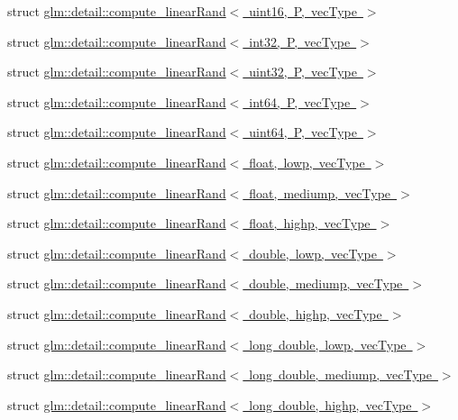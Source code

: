 \begin{DoxyCompactItemize}
\item 
struct \mbox{\hyperlink{structglm_1_1detail_1_1compute__linear_rand_3_01uint16_00_01_p_00_01vec_type_01_4}{glm\+::detail\+::compute\+\_\+linear\+Rand$<$ uint16, P, vec\+Type $>$}}
\item 
struct \mbox{\hyperlink{structglm_1_1detail_1_1compute__linear_rand_3_01int32_00_01_p_00_01vec_type_01_4}{glm\+::detail\+::compute\+\_\+linear\+Rand$<$ int32, P, vec\+Type $>$}}
\item 
struct \mbox{\hyperlink{structglm_1_1detail_1_1compute__linear_rand_3_01uint32_00_01_p_00_01vec_type_01_4}{glm\+::detail\+::compute\+\_\+linear\+Rand$<$ uint32, P, vec\+Type $>$}}
\item 
struct \mbox{\hyperlink{structglm_1_1detail_1_1compute__linear_rand_3_01int64_00_01_p_00_01vec_type_01_4}{glm\+::detail\+::compute\+\_\+linear\+Rand$<$ int64, P, vec\+Type $>$}}
\item 
struct \mbox{\hyperlink{structglm_1_1detail_1_1compute__linear_rand_3_01uint64_00_01_p_00_01vec_type_01_4}{glm\+::detail\+::compute\+\_\+linear\+Rand$<$ uint64, P, vec\+Type $>$}}
\item 
struct \mbox{\hyperlink{structglm_1_1detail_1_1compute__linear_rand_3_01float_00_01lowp_00_01vec_type_01_4}{glm\+::detail\+::compute\+\_\+linear\+Rand$<$ float, lowp, vec\+Type $>$}}
\item 
struct \mbox{\hyperlink{structglm_1_1detail_1_1compute__linear_rand_3_01float_00_01mediump_00_01vec_type_01_4}{glm\+::detail\+::compute\+\_\+linear\+Rand$<$ float, mediump, vec\+Type $>$}}
\item 
struct \mbox{\hyperlink{structglm_1_1detail_1_1compute__linear_rand_3_01float_00_01highp_00_01vec_type_01_4}{glm\+::detail\+::compute\+\_\+linear\+Rand$<$ float, highp, vec\+Type $>$}}
\item 
struct \mbox{\hyperlink{structglm_1_1detail_1_1compute__linear_rand_3_01double_00_01lowp_00_01vec_type_01_4}{glm\+::detail\+::compute\+\_\+linear\+Rand$<$ double, lowp, vec\+Type $>$}}
\item 
struct \mbox{\hyperlink{structglm_1_1detail_1_1compute__linear_rand_3_01double_00_01mediump_00_01vec_type_01_4}{glm\+::detail\+::compute\+\_\+linear\+Rand$<$ double, mediump, vec\+Type $>$}}
\item 
struct \mbox{\hyperlink{structglm_1_1detail_1_1compute__linear_rand_3_01double_00_01highp_00_01vec_type_01_4}{glm\+::detail\+::compute\+\_\+linear\+Rand$<$ double, highp, vec\+Type $>$}}
\item 
struct \mbox{\hyperlink{structglm_1_1detail_1_1compute__linear_rand_3_01long_01double_00_01lowp_00_01vec_type_01_4}{glm\+::detail\+::compute\+\_\+linear\+Rand$<$ long double, lowp, vec\+Type $>$}}
\item 
struct \mbox{\hyperlink{structglm_1_1detail_1_1compute__linear_rand_3_01long_01double_00_01mediump_00_01vec_type_01_4}{glm\+::detail\+::compute\+\_\+linear\+Rand$<$ long double, mediump, vec\+Type $>$}}
\item 
struct \mbox{\hyperlink{structglm_1_1detail_1_1compute__linear_rand_3_01long_01double_00_01highp_00_01vec_type_01_4}{glm\+::detail\+::compute\+\_\+linear\+Rand$<$ long double, highp, vec\+Type $>$}}
\end{DoxyCompactItemize}
